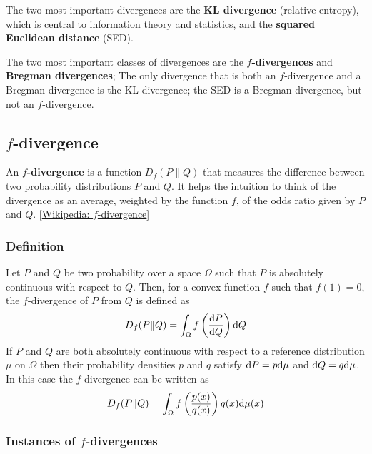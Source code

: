 The two most important divergences are the \textbf{KL divergence} (relative entropy), which is central to information theory
and statistics, and the \textbf{squared Euclidean distance} (SED).

The two most important classes of divergences are the \textbf{$f$-divergences} and \textbf{Bregman divergences};
The only divergence that is both an $f$-divergence and a Bregman divergence is the KL divergence;
the SED is a Bregman divergence, but not an $f$-divergence.

\subsection{$f$-divergence}
An \textbf{$f$-divergence} is a function $D_f(P\|Q)$ that measures the difference between two probability
distributions $P$ and $Q$. It helps the intuition to think of the divergence as an average, weighted by the
function $f$, of the odds ratio given by $P$ and $Q$. [\href{https://en.wikipedia.org/wiki/F-divergence}{Wikipedia: $f$-divergence}]

\subsubsection{Definition}
Let $P$ and $Q$ be two probability over a space $\Omega$ such that $P$ is absolutely continuous with respect to
$Q$. Then, for a convex function $f$ such that $f(1)=0$, the $f$-divergence of $P$ from $Q$ is defined as
\begin{equation}
    D_f(P\|Q) = \int_{\Omega}f\left(\frac{\mathrm{d} P}{\mathrm{d} Q}\right) \mathrm{d} Q
\end{equation}
If $P$ and $Q$ are both absolutely continuous with respect to a reference distribution $\mu$ on $\Omega$ then their
probability densities $p$ and $q$ satisfy $\mathrm{d} P = p \mathrm{d} \mu$ and $\mathrm{d} Q = q \mathrm{d} \mu$. In this case the $f$-divergence can
be written as
\begin{equation}
    D_f(P\|Q) = \int_{\Omega} f\left(\frac{p(x)}{q(x)}\right) q(x) \mathrm{d} \mu(x)
\end{equation}

\subsubsection{Instances of $f$-divergences}

